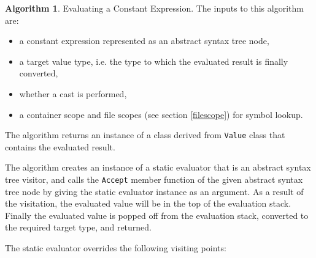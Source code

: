 \documentclass[a4paper,oneside,11pt]{book}
\theoremstyle{definition}
\newtheorem{algo}{Algorithm}[section]
\begin{document}
\begin{algo}\label{evalconstantexpr} Evaluating a Constant Expression.
The inputs to this algorithm are:
\begin{itemize}
\item
a constant expression represented as an abstract syntax tree node,
\item
a target value type, i.e. the type to which the evaluated result is finally converted,
\item
whether a cast is performed,
\item
a container scope and file scopes (see section \ref{filescope}) for symbol lookup.
\end{itemize}

The algorithm returns an instance of a class derived from \verb|Value| class that contains the evaluated result.

The algorithm creates an instance of a static evaluator that is an abstract syntax tree visitor, and calls the \verb|Accept| member function
of the given abstract syntax tree node by giving the static evaluator instance as an argument.
As a result of the visitation, the evaluated value will be in the top of the evaluation stack.
Finally the evaluated value is popped off from the evaluation stack, converted to the required target type, and returned.

The static evaluator overrides the following visiting points:


\end{algo}
\end{document}
